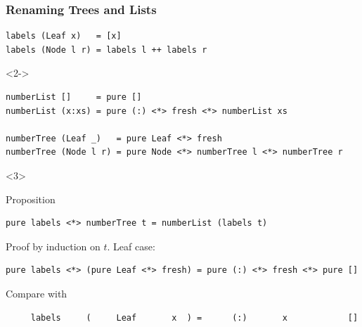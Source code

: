 \documentclass[smaller,leqno]{beamer}
\begin{document}
\begin{frame}[fragile]
\frametitle{Renaming Trees and Lists}
%
%
%
\begin{lstlisting}
labels (Leaf x)   = [x]
labels (Node l r) = labels l ++ labels r
\end{lstlisting}

\begin{uncoverenv}<2->\begin{lstlisting}
numberList []     = pure []
numberList (x:xs) = pure (:) <*> fresh <*> numberList xs

numberTree (Leaf _)   = pure Leaf <*> fresh
numberTree (Node l r) = pure Node <*> numberTree l <*> numberTree r
\end{lstlisting}\end{uncoverenv}

\begin{uncoverenv}<3>
\begin{block}{Proposition}\begin{lstlisting}
pure labels <*> numberTree t = numberList (labels t)
\end{lstlisting}\end{block}

Proof by induction on $t$. Leaf case:
\begin{lstlisting}
pure labels <*> (pure Leaf <*> fresh) = pure (:) <*> fresh <*> pure []
\end{lstlisting}
Compare with
\begin{lstlisting}
     labels     (     Leaf       x  ) =      (:)       x            []
\end{lstlisting}
\end{uncoverenv}
\end{frame}
\end{document}
